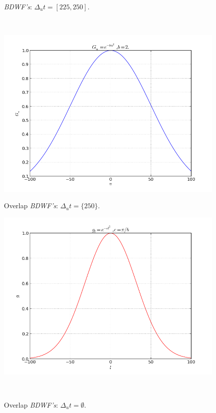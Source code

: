 \documentclass[useAMS,usenatbib]{mn2e}
\begin{document}
\begin{figure}
\begin{minipage}{0.38\linewidth}
{		\textit{BDWF's}: $\Delta_u t= [225, 250]$.}\label{ fig:fig_3a}\end{minipage}\\
\begin{minipage}{0.38\linewidth}\includegraphics[width=1\textwidth]{./Figures/gausian.png}\caption{Overlap 
		\textit{BDWF's}: $\Delta_u t=\{250\}$.}\label{fig:fig_4}\end{minipage}
\begin{minipage}{0.38\linewidth}\includegraphics[width=1\textwidth]{./Figures/gausianFour.png}\caption{Overlap 
		\textit{BDWF's}: $\Delta_u t=\emptyset$.}\label{fig:fig_5}\end{minipage}\\

\end{figure}
\end{document}
